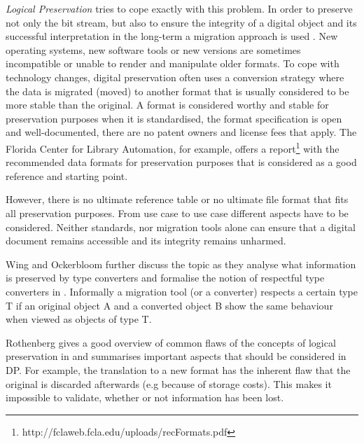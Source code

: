 \textit{Logical Preservation} tries to cope exactly with this problem. In order to preserve not only the bit stream, but also to ensure the integrity of a digital object and its successful interpretation in the long-term a migration approach is used \cite{Lee:2002:SOTADP}. New operating systems, new software tools or new versions are sometimes incompatible or unable to render and manipulate older formats. To cope with technology changes, digital preservation often uses a conversion strategy where the data is migrated (moved) to another format that is usually considered to be more stable than the original. A format is considered worthy and stable for preservation purposes when it is standardised, the format specification is open and well-documented, there are no patent owners and license fees that apply. The Florida Center for Library Automation, for example, offers a report\footnote{http://fclaweb.fcla.edu/uploads/recFormats.pdf} with the recommended data formats for preservation purposes that is considered as a good reference and starting point. 

However, there is no ultimate reference table or no ultimate file format that fits all preservation purposes. From use case to use case different aspects have to be considered. Neither standards, nor migration tools alone can ensure that a digital document remains accessible and its integrity remains unharmed.

Wing and Ockerbloom further discuss the topic as they analyse what information is preserved by type converters and formalise the notion of respectful type converters in \cite{859529}. Informally a migration tool (or a converter) respects a certain type T if an original object A and a converted object B show the same behaviour when viewed as objects of type T.

Rothenberg gives a good overview of common flaws of the concepts of logical preservation in \cite{rothenberg:1999:ensuring} and summarises important aspects that should be considered in DP. For example, the translation to a new format has the inherent flaw that the original is discarded afterwards (e.g because of storage costs). This makes it impossible to validate, whether or not information has been lost.

